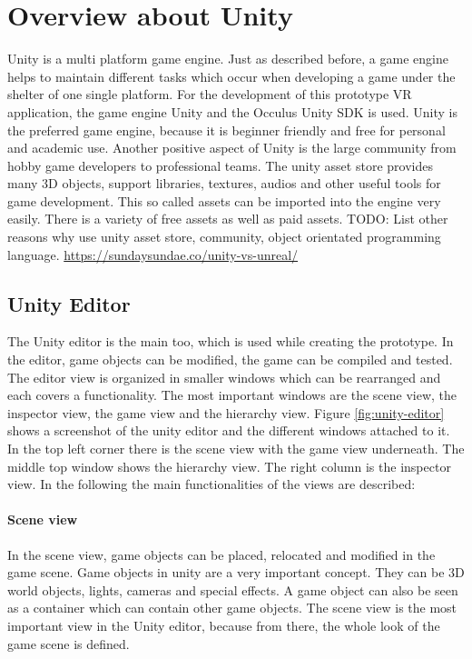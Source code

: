 \section{Overview about Unity}
Unity is a multi platform game engine. Just as described before, a game engine helps to maintain different tasks which occur when developing a game under the shelter of one single platform. 
For the development of this prototype VR application, the game engine Unity and the Occulus Unity SDK is used. Unity is the preferred game engine, because it is beginner friendly and free for personal and academic use. Another positive aspect of Unity is the large community from hobby game developers to professional teams. The unity asset store provides many 3D objects, support libraries, textures, audios and other useful tools for game development. This so called assets can be imported into the engine very easily. There is a variety of free assets as well as paid assets. TODO: List other reasons why use unity asset store, community, object orientated programming language. \url{https://sundaysundae.co/unity-vs-unreal/}\\
\subsection{Unity Editor}
The Unity editor is the main too, which is used while creating the prototype. In the editor, game objects can be modified, the game can be compiled and tested. The editor view is organized in smaller windows which can be rearranged and each covers a functionality. The most important windows are the scene view, the inspector view, the game view and the hierarchy view. Figure \ref{fig:unity-editor} shows a screenshot of the unity editor and the different windows attached to it. In the top left corner there is the scene view with the game view underneath. The middle top window shows the hierarchy view. The right column is the inspector view. In the following the main functionalities of the views are described:
\paragraph{Scene view}
In the scene view, game objects can be placed, relocated and modified in the game scene. Game objects in unity are a very important concept. They can be 3D world objects, lights, cameras and special effects. A game object can also be seen as a container which can contain other game objects. The scene view is the most important view in the Unity editor, because from there, the whole look of the game scene is defined.
